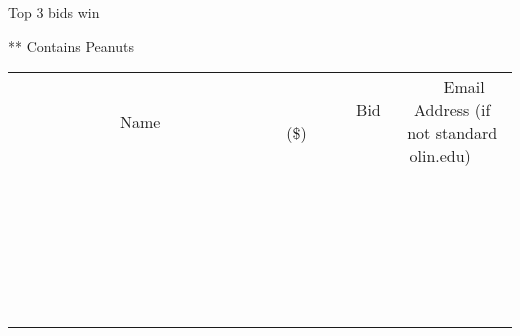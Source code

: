 \documentclass[11pt]{article}
\begin{document}
Top 3 bids win


** Contains Peanuts
\\[6ex]
\begin{tabular}{c c c}
~~~~~~~~~~~~~Name~~~~~~~~~~~~~ & ~~~~~~~~~Bid (\$)~~~~~~~~~  & ~~~Email Address (if not standard olin.edu)~~~\\
 & & \\
\hline
 & & \\
\hline
 & & \\
\hline
 & & \\
\hline
 & & \\
\hline
 & & \\
\hline
 & & \\
\hline
 & & \\
\hline
 & & \\
\hline
 & & \\
\hline
 & & \\
\hline
 & & \\
\hline
 & & \\
\hline
 & & \\
\hline
 & & \\
\hline
 & & \\
\hline
 & & \\
\hline
 & & \\
\hline
 & & \\
\hline
 & & \\
\hline
 & & \\
\hline
 & & \\
\hline
 & & \\
\hline
 & & \\
\hline
 & & \\
\hline
 & & \\
\hline
\end{tabular}
\newpage
\end{document}
